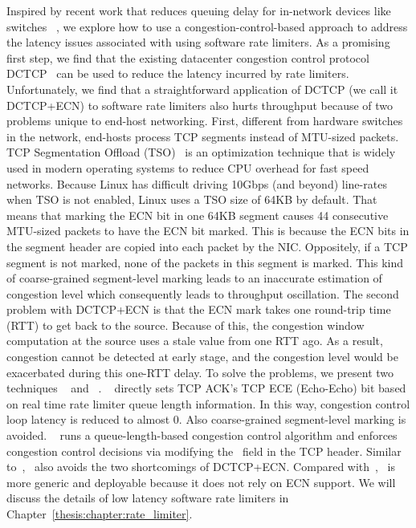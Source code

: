 Inspired by recent work that reduces queuing delay for in-network
devices like switches ~\cite{dctcp,he2016ac,mittal2015timely,zhu2015congestion}, we explore how to
use a congestion-control-based approach to address the latency issues
associated with using software rate limiters.  As a promising first
step, we find that the existing datacenter congestion control protocol
DCTCP~\cite{dctcp} can be used to reduce the latency incurred
by rate limiters. Unfortunately, we find that a straightforward
application of DCTCP (we call it DCTCP+ECN) to software rate limiters also hurts throughput because of 
two problems unique to end-host networking. First, different from hardware switches in the
network, end-hosts process TCP segments instead of MTU-sized packets.
TCP Segmentation Offload (TSO)~\cite{tcp-segment-offload} is an
optimization technique that is widely used in modern operating systems
to reduce CPU overhead for fast speed networks. Because Linux has
difficult driving 10Gbps (and beyond) line-rates when TSO is not
enabled, Linux uses a TSO size of 64KB by default. That means that
marking the ECN bit in one 64KB segment causes 44 consecutive MTU-sized
packets to have the ECN bit marked. This is because the ECN bits in the
segment header are copied into each packet by the NIC. Oppositely, if a
TCP segment is not marked, none of the packets in this segment is
marked. This kind of coarse-grained segment-level marking leads to an
inaccurate estimation of congestion level which consequently leads to
throughput oscillation.
The second problem with DCTCP+ECN is that the ECN mark takes one
round-trip time (RTT) to get back to the source.  Because of this, the
congestion window computation at the source uses a stale value from one
RTT ago. As a result, congestion cannot be detected at early stage, and
the congestion level would be exacerbated during this one-RTT delay.
To solve the problems, we present two techniques \textemdash\xspace~\dem{} and ~\spring{}.
~\dem{} directly sets TCP ACK's TCP ECE (Echo-Echo) bit based on real time rate limiter queue length information.
In this way, congestion control loop latency is reduced to almost 0. Also coarse-grained segment-level marking is avoided.
~\spring{} runs a queue-length-based congestion control algorithm and enforces congestion control decisions via modifying
the~\rwnd{} field in the TCP header. Similar to~\dem{},~\spring{} also avoids the two shortcomings of DCTCP+ECN. 
Compared with~\dem{},~\spring{}
is more generic and deployable because it does not rely on ECN support.
We will discuss the details of low latency software rate limiters in Chapter~\ref{thesis:chapter:rate_limiter}.

